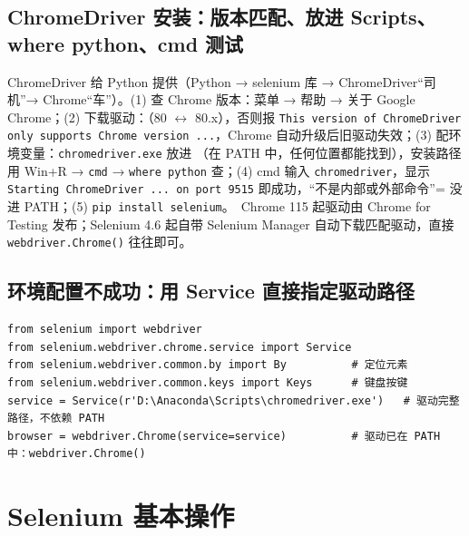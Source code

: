 \subsection{ChromeDriver 安装：版本匹配、放进 Scripts、where python、cmd 测试}
ChromeDriver 给 Python 提供（Python → selenium 库 → ChromeDriver“司机”→ Chrome“车”）。(1) 查 Chrome 版本：菜单 → 帮助 → 关于 Google Chrome；(2) 下载驱动：（80 $\leftrightarrow$ 80.x），否则报 \texttt{This version of ChromeDriver only supports Chrome version ...}，Chrome 自动升级后旧驱动失效；(3) 配环境变量：\texttt{chromedriver.exe} 放进 （在 PATH 中，任何位置都能找到），安装路径用 Win+R → \texttt{cmd} → \texttt{where python} 查；(4) cmd 输入 \texttt{chromedriver}，显示 \texttt{Starting ChromeDriver ... on port 9515} 即成功，“不是内部或外部命令”= 没进 PATH；(5) \texttt{pip install selenium}。\tagext\ Chrome 115 起驱动由 Chrome for Testing 发布；Selenium 4.6 起自带 Selenium Manager 自动下载匹配驱动，直接 \texttt{webdriver.Chrome()} 往往即可。

\subsection{环境配置不成功：用 Service 直接指定驱动路径}
\begin{lstlisting}[style=pyD07]
from selenium import webdriver
from selenium.webdriver.chrome.service import Service
from selenium.webdriver.common.by import By          # 定位元素
from selenium.webdriver.common.keys import Keys      # 键盘按键
service = Service(r'D:\Anaconda\Scripts\chromedriver.exe')   # 驱动完整路径，不依赖 PATH
browser = webdriver.Chrome(service=service)          # 驱动已在 PATH 中：webdriver.Chrome()
\end{lstlisting}

\section{Selenium 基本操作}

